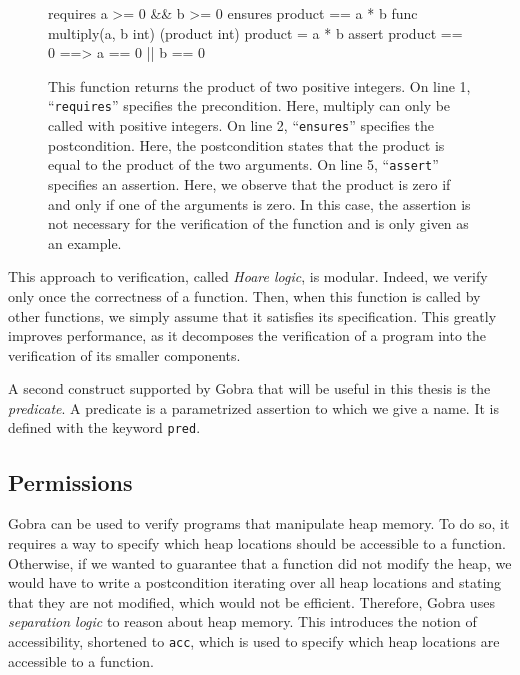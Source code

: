\begin{figure}
    \begin{gobra}
requires a >= 0 && b >= 0
ensures  product == a * b
func multiply(a, b int) (product int) {
    product = a * b
    assert product == 0 ==> a == 0 || b == 0
}
    \end{gobra}
    \caption{This function returns the product of two positive integers. On line 1, “\texttt{requires}” specifies the precondition. Here, multiply can only be called with positive integers. On line 2, “\texttt{ensures}” specifies the postcondition. Here, the postcondition states that the product is equal to the product of the two arguments. On line 5, “\texttt{assert}” specifies an assertion. Here, we observe that the product is zero if and only if one of the arguments is zero. In this case, the assertion is not necessary for the verification of the function and is only given as an example.}
    \label{lst:multiply-example}
\end{figure}

This approach to verification, called \emph{Hoare logic}, is modular. Indeed, we verify only once the correctness of a function. Then, when this function is called by other functions, we simply assume that it satisfies its specification.
This greatly improves performance, as it decomposes the verification of a program into the verification of its smaller components.

A second construct supported by Gobra that will be useful in this thesis is the \emph{predicate}.
A predicate is a parametrized assertion to which we give a name.
It is defined with the keyword \texttt{pred}. 

\subsection{Permissions}
\label{sec:permissions}

Gobra can be used to verify programs that manipulate heap memory.
To do so, it requires a way to specify which heap locations should be accessible to a function.
Otherwise, if we wanted to guarantee that a function did not modify the heap, we would have to write a postcondition iterating over all heap locations and stating that they are not modified, which would not be efficient.
Therefore, Gobra uses \emph{separation logic} to reason about heap memory. This introduces the notion of accessibility, shortened to \texttt{acc}, which is used to specify which heap locations are accessible to a function.

